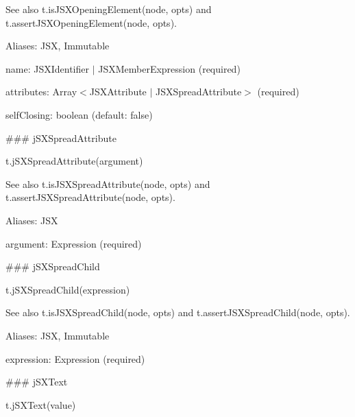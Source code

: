 See also {\ttfamily t.\+is\+J\+S\+X\+Opening\+Element(node, opts)} and {\ttfamily t.\+assert\+J\+S\+X\+Opening\+Element(node, opts)}.

Aliases\+: {\ttfamily J\+SX}, {\ttfamily Immutable}


\begin{DoxyItemize}
\item {\ttfamily name}\+: {\ttfamily J\+S\+X\+Identifier $\vert$ J\+S\+X\+Member\+Expression} (required)
\item {\ttfamily attributes}\+: {\ttfamily Array$<$J\+S\+X\+Attribute $\vert$ J\+S\+X\+Spread\+Attribute$>$} (required)
\item {\ttfamily self\+Closing}\+: {\ttfamily boolean} (default\+: {\ttfamily false}) 


\end{DoxyItemize}

\#\#\# j\+S\+X\+Spread\+Attribute 
\begin{DoxyCode}
t.jSXSpreadAttribute(argument)
\end{DoxyCode}


See also {\ttfamily t.\+is\+J\+S\+X\+Spread\+Attribute(node, opts)} and {\ttfamily t.\+assert\+J\+S\+X\+Spread\+Attribute(node, opts)}.

Aliases\+: {\ttfamily J\+SX}


\begin{DoxyItemize}
\item {\ttfamily argument}\+: {\ttfamily Expression} (required) 


\end{DoxyItemize}

\#\#\# j\+S\+X\+Spread\+Child 
\begin{DoxyCode}
t.jSXSpreadChild(expression)
\end{DoxyCode}


See also {\ttfamily t.\+is\+J\+S\+X\+Spread\+Child(node, opts)} and {\ttfamily t.\+assert\+J\+S\+X\+Spread\+Child(node, opts)}.

Aliases\+: {\ttfamily J\+SX}, {\ttfamily Immutable}


\begin{DoxyItemize}
\item {\ttfamily expression}\+: {\ttfamily Expression} (required) 


\end{DoxyItemize}

\#\#\# j\+S\+X\+Text 
\begin{DoxyCode}
t.jSXText(value)
\end{DoxyCode}


